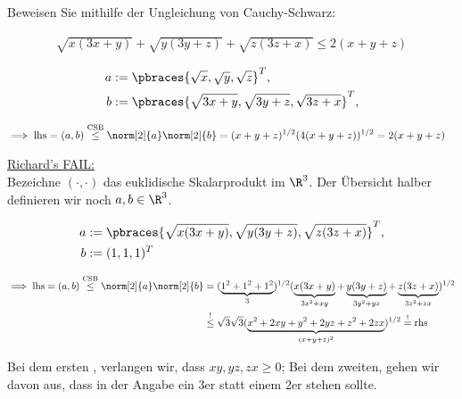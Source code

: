 
\begin{exercise}

Beweisen Sie mithilfe der Ungleichung von Cauchy-Schwarz:

\begin{align*}
    \sqrt{x (3x + y)} + \sqrt{y (3y + z)} + \sqrt{z (3z + x)}
    \leq
    2 (x + y + z)
\end{align*}

\end{exercise}


\begin{solution}

\begin{align*}
    a & := \pbraces
    {
        \sqrt{x},
        \sqrt{y},
        \sqrt{z}
    }^T, \\
    b & := \pbraces
    {
        \sqrt{3x + y},
        \sqrt{3y + z},
        \sqrt{3z + x}
    }^T, \\
\end{align*}

\begin{align*}
    \implies
    \text{lhs}
    =
    (a, b)
    \stackrel{\text{CSB}}{\leq}
    \norm[2]{a} \norm[2]{b}
    & =
    (x + y + z)^{1/2}
    (4(x+y+z)
    )^{1/2} = 2(x+y+z)
\end{align*}

\underline{Richard's FAIL:} \\

Bezeichne $(\cdot, \cdot)$ das euklidische Skalarprodukt im $\R^3$.
Der Übersicht halber definieren wir noch $a, b \in \R^3$.

\begin{align*}
    a & := \pbraces
    {
        \sqrt{x (3x + y)},
        \sqrt{y (3y + z)},
        \sqrt{z (3z + x)}
    }^T, \\
    b & := (1, 1, 1)^T
\end{align*}

\begin{align*}
    \implies
    \text{lhs}
    =
    (a, b)
    \stackrel{\text{CSB}}{\leq}
    \norm[2]{a} \norm[2]{b}
    & =
    (
        \underbrace
        {1^2 + 1^2 + 1^2}_{3}
    )^{1/2}
    (
        \underbrace{x (3x + y)}_{3x^2 + xy}
        +
        \underbrace{y (3y + z)}_{3y^2 + yz}
        +
        \underbrace{z (3z + x)}_{3z^2 + zx}
    )^{1/2} \\
    & \stackrel{!}{\leq}
    \sqrt{3} \sqrt{3}
    (
        \underbrace
        {x^2 + 2xy + y^2 + 2yz + z^2 + 2zx}_{(x + y + z)^2}
    )^{1/2}
    \stackrel{!}{=}
    \text{rhs}
\end{align*}

Bei dem ersten \Quote{!}, verlangen wir, dass $xy, yz, zx \geq 0$;
Bei dem zweiten, gehen wir davon aus, dass in der Angabe ein $3$er statt einem $2$er stehen sollte.

\end{solution}


